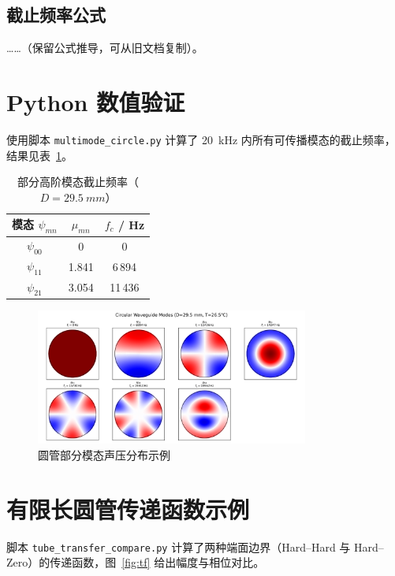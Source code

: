 \documentclass[12pt,a4paper]{article}
\begin{document}
\subsection{截止频率公式}
……（保留公式推导，可从旧文档复制）。

\section{Python 数值验证}
使用脚本 \texttt{multimode\_circle.py} 计算了 \SI{20}{kHz} 内所有可传播模态的截止频率，结果见表~\ref{tab:python-fc}。

\begin{table}[h]
  \centering
  \caption{部分高阶模态截止频率（$D=\SI{29.5}{mm}$）}
  \label{tab:python-fc}
  \begin{tabular}{ccc}
    \toprule
    模态 $\psi_{mn}$ & $\mu_{mn}$ & $f_c$ / Hz \\
    \midrule
    $\psi_{00}$ & 0 & 0 \\
    $\psi_{11}$ & 1.841 & 6\,894 \\
    $\psi_{21}$ & 3.054 & 11\,436 \\
    \bottomrule
  \end{tabular}
\end{table}

\begin{figure}[h]
  \centering
  \includegraphics[width=0.8\textwidth]{../02-code/circle_modes.png}
  \caption{圆管部分模态声压分布示例}
  \label{fig:modes}
\end{figure}

\section{有限长圆管传递函数示例}
脚本 \texttt{tube\_transfer\_compare.py} 计算了两种端面边界（Hard--Hard 与 Hard--Zero）的传递函数，图~\ref{fig:tf} 给出幅度与相位对比。
\end{document}
